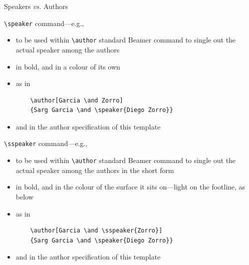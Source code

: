 \begin{frame}{Speakers \emph{vs.} Authors}
%
\begin{exampleblock}{\texttt{\textbackslash{}speaker} command---e.g., }
\begin{itemize}
	\item to be used within \texttt{\textbackslash{}author} standard Beamer command to single out the actual speaker among the authors
	\item in bold, and in a colour of its own
	\item[e.g.] as in
\begin{verbatim}
	\author[Garcia \and Zorro]
	{Sarg Garcia \and \speaker{Diego Zorro}}
\end{verbatim}
	\item and in the author specification of this template
\end{itemize}
\end{exampleblock}
%
\begin{block}{\texttt{\textbackslash{}sspeaker} command---e.g., }
\begin{itemize}
	\item to be used within \texttt{\textbackslash{}author} standard Beamer command to single out the actual speaker among the authors in the short form
	\item in bold, and in the colour of the surface it sits on---light on the footline, as below
	\item[e.g.] as in
\begin{verbatim}
	\author[Garcia \and \sspeaker{Zorro}]
	{Sarg Garcia \and \speaker{Diego Zorro}}
\end{verbatim}
	\item and in the author specification of this template
\end{itemize}
\end{block}

\end{frame}
